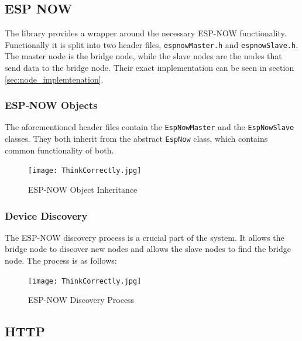     \subsection{ESP NOW} \label{sec:farilib_espnow}
    The library provides a wrapper around the necessary ESP-NOW functionality.
    Functionally it is split into two header files, \texttt{espnowMaster.h} and 
    \texttt{espnowSlave.h}. The master node is the bridge node, while the slave
    nodes are the nodes that send data to the bridge node. Their exact implementation
    can be seen in section \ref{sec:node_implemtenation}.
        \subsubsection{ESP-NOW Objects}
        The aforementioned header files contain the \texttt{EspNowMaster} and the
        \texttt{EspNowSlave} classes. They both inherit from the abstract 
        \texttt{EspNow} class, which contains common functionality of both.
        \begin{figure}[H]
            \centering
            \texttt{[image: ThinkCorrectly.jpg]}
            \caption{ESP-NOW Object Inheritance}
        \end{figure}

        \subsubsection{Device Discovery}
        The ESP-NOW discovery process is a crucial part of the system. It allows the
        bridge node to discover new nodes and allows the slave nodes to find the bridge
        node. The process is as follows:
        \begin{figure}
            \centering
            \texttt{[image: ThinkCorrectly.jpg]}
            \caption{ESP-NOW Discovery Process}
            \label{fig:espnow_discovery}
        \end{figure}
    \subsection{HTTP} \label{sec:farilib_http}